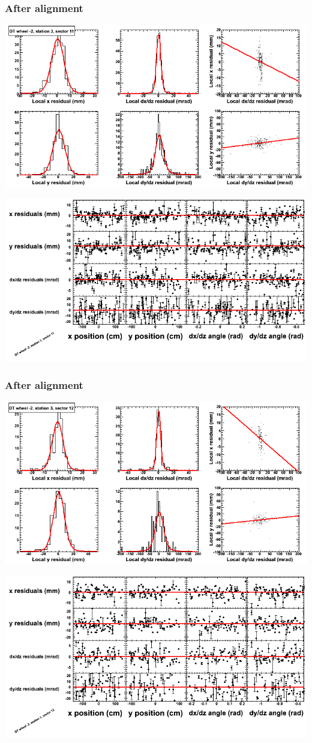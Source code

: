 \documentclass[compress]{beamer}
\begin{document}
\begin{frame}
\frametitle{After alignment}
\includegraphics[width=0.7\linewidth]{NOV4_fitfunctions/MBwhAst3sec11_bellcurves.png}

\includegraphics[width=0.7\linewidth]{NOV4_fitfunctions/MBwhAst3sec11_polynomials.png}
\end{frame}

\begin{frame}
\frametitle{After alignment}
\includegraphics[width=0.7\linewidth]{NOV4_fitfunctions/MBwhAst3sec12_bellcurves.png}

\includegraphics[width=0.7\linewidth]{NOV4_fitfunctions/MBwhAst3sec12_polynomials.png}
\end{frame}
\end{document}
